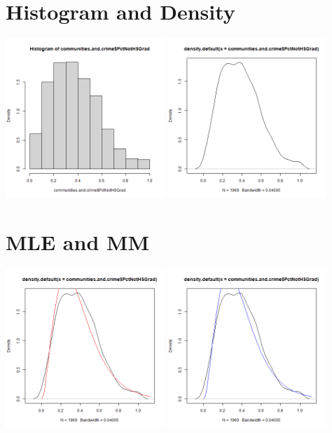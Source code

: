\documentclass[12pt, letterpaper]{report}
\begin{document}
\section{Histogram and Density}


\begin{center}
\includegraphics[width=0.45\textwidth]{gamma/PctNotHsGrad_hist}
\includegraphics[width=0.45\textwidth]{gamma/PctNotHsGrad_density}
\end{center}

\section{MLE and MM}


\begin{center}
\includegraphics[width=0.45\textwidth]{gamma/PctNotHsGrad_mle}
\includegraphics[width=0.45\textwidth]{gamma/PctNotHsGrad_mm}
\end{center}
\end{document}

